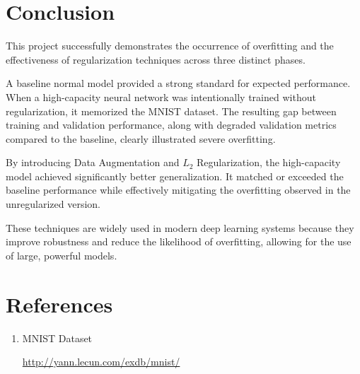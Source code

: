 \documentclass[12pt]{article}
\begin{document}

\section{Conclusion}

This project successfully demonstrates the occurrence of overfitting and the effectiveness of regularization techniques across three distinct phases.

A baseline normal model provided a strong standard for expected performance. When a high-capacity neural network was intentionally trained without regularization, it memorized the MNIST dataset. The resulting gap between training and validation performance, along with degraded validation metrics compared to the baseline, clearly illustrated severe overfitting.

By introducing Data Augmentation and $L_2$ Regularization, the high-capacity model achieved significantly better generalization. It matched or exceeded the baseline performance while effectively mitigating the overfitting observed in the unregularized version.

These techniques are widely used in modern deep learning systems because they improve robustness and reduce the likelihood of overfitting, allowing for the use of large, powerful models.


\section{References}

\begin{enumerate}


\item MNIST Dataset

\url{http://yann.lecun.com/exdb/mnist/}

\end{enumerate}
\end{document}
